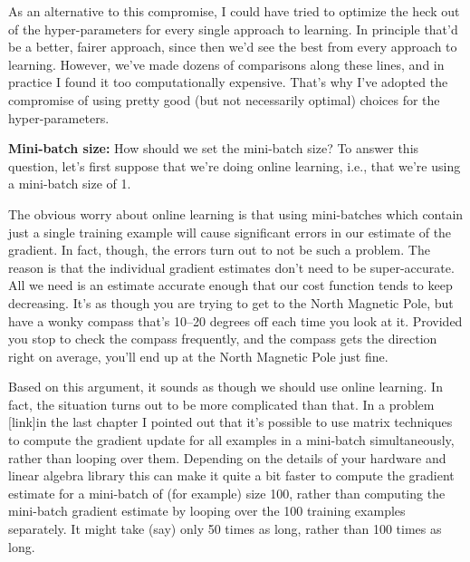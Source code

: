 \documentclass[a4paper,twoside,10pt]{book}
\begin{document}
As an alternative to this compromise, I could have tried to optimize the heck out of the hyper-parameters for every single approach to learning. In principle that'd be a better, fairer approach, since then we'd see the best from every approach to learning. However, we've made dozens of comparisons along these lines, and in practice I found it too computationally expensive. That's why I've adopted the compromise of using pretty good (but not necessarily optimal) choices for the hyper-parameters.


\textbf{Mini-batch size:} How should we set the mini-batch size? To answer this question, let's first suppose that we're doing online learning, i.e., that we're using a mini-batch size of 1.

The obvious worry about online learning is that using mini-batches which contain just a single training example will cause significant errors in our estimate of the gradient. In fact, though, the errors turn out to not be such a problem. The reason is that the individual gradient estimates don't need to be super-accurate. All we need is an estimate accurate enough that our cost function tends to keep decreasing. It's as though you are trying to get to the North Magnetic Pole, but have a wonky compass that's 10--20 degrees off each time you look at it. Provided you stop to check the compass frequently, and the compass gets the direction right on average, you'll end up at the North Magnetic Pole just fine.

Based on this argument, it sounds as though we should use online learning. In fact, the situation turns out to be more complicated than that. In a problem [link]in the last chapter I pointed out that it's possible to use matrix techniques to compute the gradient update for all examples in a mini-batch simultaneously, rather than looping over them. Depending on the details of your hardware and linear algebra library this can make it quite a bit faster to compute the gradient estimate for a mini-batch of (for example) size 100, rather than computing the mini-batch gradient estimate by looping over the 100 training examples separately. It might take (say) only 50 times as long, rather than 100 times as long.
\end{document}
